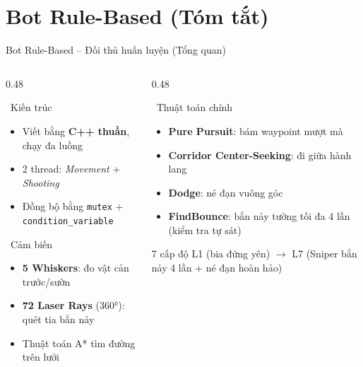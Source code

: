 \documentclass[aspectratio=169, 11pt]{beamer}
\begin{document}
\section{Bot Rule-Based (Tóm tắt)}

\begin{frame}{Bot Rule-Based -- Đối thủ huấn luyện (Tổng quan)}
  \begin{columns}[T]
    \begin{column}{0.48\textwidth}
      \begin{block}{\faCogs~Kiến trúc}
        \begin{itemize}
          \item Viết bằng \textbf{C++ thuần}, chạy đa luồng
          \item 2 thread: \textit{Movement} + \textit{Shooting}
          \item Đồng bộ bằng \texttt{mutex} + \texttt{condition\_variable}
        \end{itemize}
      \end{block}
      \vspace{4pt}
      \begin{block}{\faRadiation~Cảm biến}
        \begin{itemize}
          \item \textbf{5 Whiskers}: đo vật cản trước/sườn
          \item \textbf{72 Laser Rays} (360°): quét tia bắn nảy
          \item Thuật toán A* tìm đường trên lưới
        \end{itemize}
      \end{block}
    \end{column}
    \begin{column}{0.48\textwidth}
      \begin{block}{\faBullseye~Thuật toán chính}
        \begin{itemize}
          \item \textbf{Pure Pursuit}: bám waypoint mượt mà
          \item \textbf{Corridor Center-Seeking}: đi giữa hành lang
          \item \textbf{Dodge}: né đạn vuông góc
          \item \textbf{FindBounce}: bắn nảy tường tối đa 4 lần (kiểm tra tự sát)
        \end{itemize}
      \end{block}
      \vspace{4pt}
      \begin{alertblock}{7 cấp độ}
        L1 (bia đứng yên) $\to$ L7 (Sniper bắn nảy 4 lần + né đạn hoàn hảo)
      \end{alertblock}
    \end{column}
  \end{columns}
\end{frame}
\end{document}
